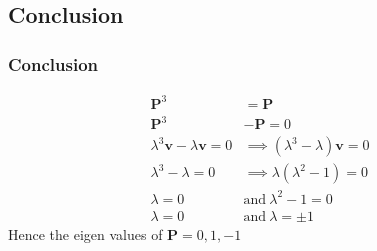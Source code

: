 \documentclass{beamer}
\providecommand{\brak}[1]{\ensuremath{\left(#1\right)}}
\theoremstyle{remark}
\let\vec\mathbf
\numberwithin{equation}{section}
\begin{document}
\subsection{Conclusion}
\begin{frame}
\frametitle{Conclusion}
  \begin{align}
     \vec{P}^3&=\vec{P} \\
     \vec{P}^3&-\vec{P}=0 \\
     \lambda^3\vec{v}-\lambda\vec{v}=0  &\implies \brak{\lambda^3-\lambda}\vec{v}=0 \\
     \lambda^3-\lambda=0 &\implies \lambda\brak{\lambda^2-1}=0 \\
     \lambda=0\ &\text{and}\ \lambda^2-1=0 \\
     \lambda=0\ &\text{and}\ \lambda=\pm1
 \end{align}
 Hence the eigen values of $\vec{P} = 0,1,-1$
 \end{frame}
\end{document}
